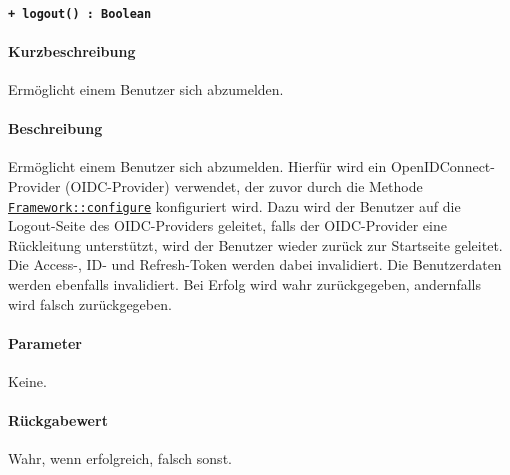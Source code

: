 \paragraph{\texttt{+ logout() : Boolean}}\label{AP_Framework_logout}%
\paragraph*{Kurzbeschreibung}
Ermöglicht einem Benutzer sich abzumelden.
\paragraph*{Beschreibung}
Ermöglicht einem Benutzer sich abzumelden.
Hierfür wird ein OpenIDConnect-Provider (OIDC-Provider) verwendet, der zuvor durch die Methode \hyperref[AP_Framework_configure]{\texttt{Framework::configure}} konfiguriert wird.
Dazu wird der Benutzer auf die Logout-Seite des OIDC-Providers geleitet, falls der OIDC-Provider eine Rückleitung unterstützt, wird der Benutzer wieder zurück zur Startseite geleitet.
Die Access-, ID- und Refresh-Token werden dabei invalidiert.
Die Benutzerdaten werden ebenfalls invalidiert.
Bei Erfolg wird wahr zurückgegeben, andernfalls wird falsch zurückgegeben.
\paragraph*{Parameter}
Keine.
\paragraph*{Rückgabewert}
Wahr, wenn erfolgreich, falsch sonst.

